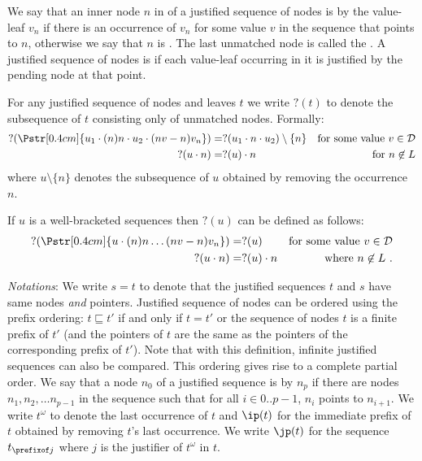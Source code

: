We say that an inner node $n$ in of a justified sequence of nodes is
 by the value-leaf $v_n$ if there is an occurrence of $v_n$ for some value $v$ in the
sequence that points to $n$, otherwise we say that $n$ is
. The last unmatched node is called the
.  A justified sequence of nodes is
 if each value-leaf occurring in it is justified by the pending node at that point.

For any justified sequence of nodes and leaves $t$ we write $?(t)$ to denote the subsequence of $t$ consisting only of unmatched nodes. Formally:
\begin{align*}
  ?(\Pstr[0.4cm]{u_1 \cdot (n){n} \cdot u_2 \cdot (nv-n){v_n} }  ) &= ?(u_1 \cdot n \cdot u_2) \setminus \{ n \}
        & \mbox{for some value $v\in\mathcal{D}$} \\
  ?(u \cdot n)   &= ?(u)\cdot n    & \mbox{for $n\not\in L$}
\end{align*}
where $u \setminus \{ n \}$ denotes the subsequence of $u$ obtained by removing the occurrence $n$.

If $u$ is a well-bracketed sequences then $?(u)$ can be defined as follows:
\begin{align*}
  ?(\Pstr[0.4cm]{u \cdot (n){n} \ldots (nv-n){v_n} }  ) &= ?(u)
          & \mbox{for some value $v\in\mathcal{D}$}  \\
    ?(u \cdot n) &= ?(u)\cdot n    & \mbox{where $n\not\in L$} \ .
\end{align*}

\bigskip

\emph{Notations}: We write $s = t$ to denote that the justified sequences $t$ and $s$
have same nodes \emph{and} pointers. Justified sequence of nodes can
be ordered using the prefix ordering: $t \sqsubseteq t'$ if and only
if $t=t'$ or the sequence of nodes $t$ is a finite prefix of $t'$
(and the pointers of $t$ are the same as the pointers of the
corresponding prefix of $t'$). Note that with this definition,
infinite justified sequences can also be compared. This ordering
gives rise to a complete partial order.
We say that a node $n_0$ of a justified sequence is  by $n_p$ if there are nodes $n_1, n_2, \ldots n_{p-1}$ in the sequence such that for all $i\in 0..p-1$, $n_i$ points to $n_{i+1}$.
We write $t^\omega$ to denote the last occurrence of $t$ and $\ip(t)$ for the immediate prefix of $t$ obtained by removing $t$'s last occurrence. We write $\jp(t)$ for the sequence $t_{\prefixof j}$ where $j$ is the justifier of $t^\omega$ in $t$.
\smallskip

